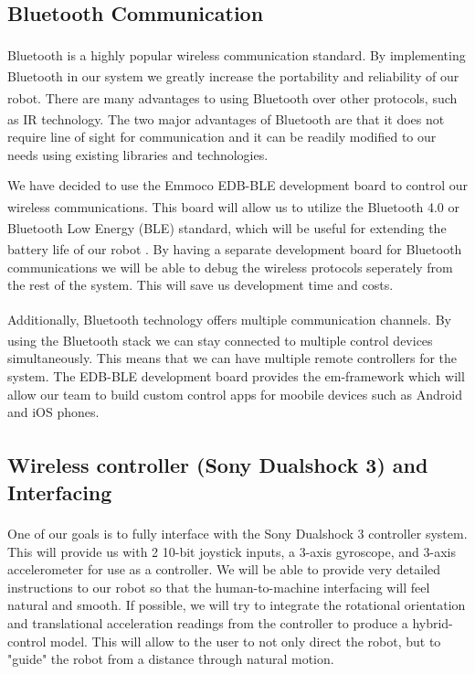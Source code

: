 \documentclass[11pt]{report}
\begin{document}
\begin{spacing}{1.5}
\subsection*{Bluetooth\textsuperscript{\textregistered} Communication}

Bluetooth\textsuperscript{\textregistered} is a highly popular wireless communication standard.  By implementing Bluetooth\textsuperscript{\textregistered} in our system we greatly increase the portability and reliability of our robot.  There are many advantages to using Bluetooth\textsuperscript{\textregistered} over other protocols, such as IR technology.  The two major advantages of Bluetooth\textsuperscript{\textregistered} are that it does not require line of sight for communication and it can be readily modified to our needs using existing libraries and technologies.

We have decided to use the Emmoco EDB-BLE development board to control our wireless communications.  This board will allow us to utilize the Bluetooth\textsuperscript{\textregistered} 4.0 or Bluetooth\textsuperscript{\textregistered} Low Energy (BLE) standard, which will be useful for extending the battery life of our robot \cite{Nokia}.  By having a separate development board for Bluetooth\textsuperscript{\textregistered} communications we will be able to debug the wireless protocols seperately from the rest of the system.  This will save us development time and costs.

Additionally, Bluetooth\textsuperscript{\textregistered} technology offers multiple communication channels.  By using the Bluetooth\textsuperscript{\textregistered} stack we can stay connected to multiple control devices simultaneously.  This means that we can have multiple remote controllers for the system.  The EDB-BLE development board provides the em-framework which will allow our team to build custom control apps for moobile devices such as Android and iOS phones.

\subsection*{Wireless controller (Sony Dualshock 3\textsuperscript{\textregistered}) and Interfacing}

One of our goals is to fully interface with the Sony Dualshock 3\textsuperscript{\textregistered} controller system.  This will provide us with 2 10-bit joystick inputs, a 3-axis gyroscope, and 3-axis accelerometer for use as a controller.  We will be able to provide very detailed instructions to our robot so that the human-to-machine interfacing will feel natural and smooth.  If possible, we will try to integrate the rotational orientation and translational acceleration readings from the controller to produce a hybrid-control model.  This will allow to the user to not only direct the robot, but to "guide" the robot from a distance through natural motion.


\end{spacing}
\end{document}
